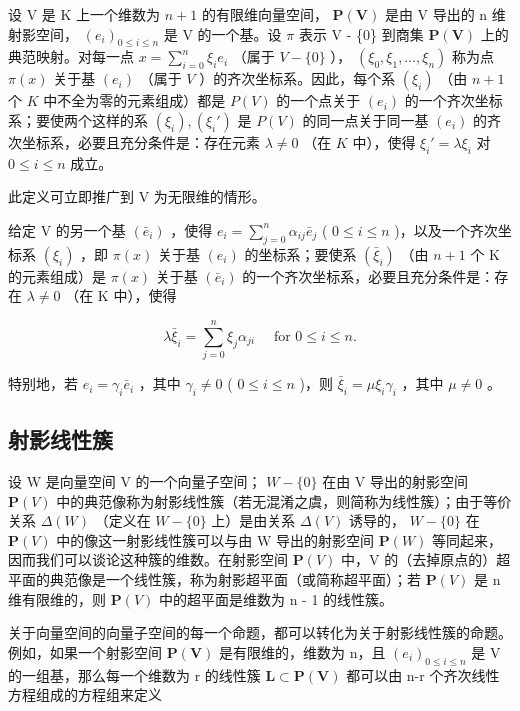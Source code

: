 设 V 是 K 上一个维数为 \(n + 1\) 的有限维向量空间， \(\mathbf{P}(\mathbf{V})\) 是由 V 导出的 n 维射影空间， \((e_{i})_{0 \leqslant i \leqslant n}\) 是 V 的一个基。设 \(\pi\) 表示 V - \{0\} 到商集 \(\mathbf{P}(\mathbf{V})\) 上的典范映射。对每一点 \(x = \sum_{i=0}^{n} \xi_i e_i\) （属于 \(V - \{0\}\) ）， \((\xi_0, \xi_1, \ldots, \xi_n)\) 称为点 \(\pi(x)\) 关于基 \((e_i)\) （属于 \(V\) ）的齐次坐标系。因此，每个系 \((\xi_i)\) （由 \(n + 1\) 个 \(K\) 中不全为零的元素组成）都是 \(P(V)\) 的一个点关于 \((e_i)\) 的一个齐次坐标系；要使两个这样的系 \((\xi_i), (\xi_i')\) 是 \(P(V)\) 的同一点关于同一基 \((e_i)\) 的齐次坐标系，必要且充分条件是：存在元素 \(\lambda \neq 0\) （在 \(K\) 中），使得 \(\xi_i' = \lambda \xi_i\) 对 \(0 \leqslant i \leqslant n\) 成立。

此定义可立即推广到 V 为无限维的情形。

给定 V 的另一个基 \((\bar{e}_i)\) ，使得 \(e_i = \sum_{j=0}^{n} \alpha_{ij} \bar{e}_j\) ( \(0 \leqslant i \leqslant n\) )，以及一个齐次坐标系 \((\xi_i)\) ，即 \(\pi(x)\) 关于基 \((e_i)\) 的坐标系；要使系 \((\bar{\xi}_i)\) （由 \(n+1\) 个 K 的元素组成）是 \(\pi(x)\) 关于基 \((\bar{e}_i)\) 的一个齐次坐标系，必要且充分条件是：存在 \(\lambda \neq 0\) （在 K 中），使得

\[
\lambda \bar {\xi} _ {i} = \sum_ {j = 0} ^ {n} \xi_ {j} \alpha_ {j i} \quad \text { for } 0 \leqslant i \leqslant n.
\]

特别地，若 \(e_i = \gamma_i \bar{e}_i\) ，其中 \(\gamma_i \neq 0\) ( \(0 \leqslant i \leqslant n\) )，则 \(\bar{\xi}_i = \mu \xi_i \gamma_i\) ，其中 \(\mu \neq 0\) 。

\subsection{射影线性簇}

设 W 是向量空间 V 的一个向量子空间； \(W - \{0\}\) 在由 V 导出的射影空间 \(\mathbf{P}(V)\) 中的典范像称为射影线性簇（若无混淆之虞，则简称为线性簇）；由于等价关系 \(\Delta(W)\) （定义在 \(W - \{0\}\) 上）是由关系 \(\Delta(V)\) 诱导的， \(W - \{0\}\) 在 \(\mathbf{P}(V)\) 中的像这一射影线性簇可以与由 W 导出的射影空间 \(\mathbf{P}(W)\) 等同起来，因而我们可以谈论这种簇的维数。在射影空间 \(\mathbf{P}(V)\) 中，V 的（去掉原点的）超平面的典范像是一个线性簇，称为射影超平面（或简称超平面）；若 \(\mathbf{P}(V)\) 是 n 维有限维的，则 \(\mathbf{P}(V)\) 中的超平面是维数为 n - 1 的线性簇。

关于向量空间的向量子空间的每一个命题，都可以转化为关于射影线性簇的命题。例如，如果一个射影空间 \(\mathbf{P}(\mathbf{V})\) 是有限维的，维数为 n，且 \((e_{i})_{0\leqslant i\leqslant n}\) 是 V 的一组基，那么每一个维数为 r 的线性簇 \(\mathbf{L}\subset\mathbf{P}(\mathbf{V})\) 都可以由 n-r 个齐次线性方程组成的方程组来定义

